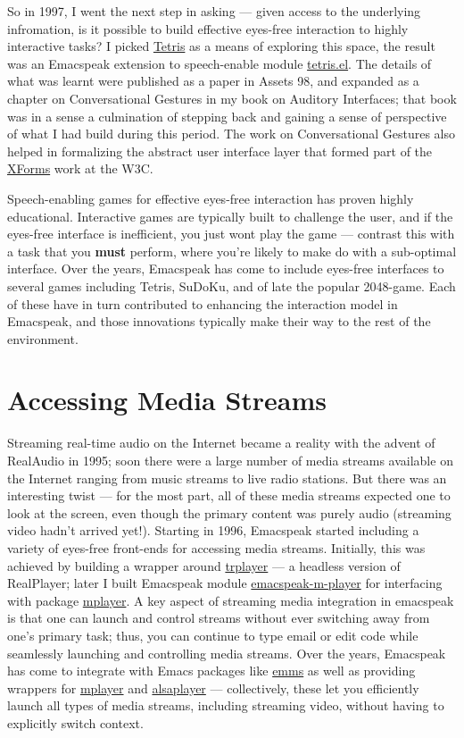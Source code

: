 \documentclass[11pt]{article}
\begin{document}
So in 1997, I went the
next step in asking  —   given access to the underlying
infromation, is it possible to build effective eyes-free
interaction to highly interactive tasks? I picked \uline{Tetris} as a
means of exploring this space, the result was an Emacspeak
extension to speech-enable module \uline{tetris.el}. The details of
what was learnt were published as a paper in Assets 98, and
expanded as a chapter on Conversational Gestures in my book on
Auditory Interfaces; that book was in a sense a culmination of
stepping back and gaining a sense of perspective of what I had
build during this period. The work on Conversational Gestures
also helped in formalizing the abstract user interface layer that
formed part of the \href{http://www.w3.org/MarkUp/Forms/}{XForms}  work at the W3C.

Speech-enabling games for effective eyes-free interaction  has
proven highly educational. Interactive games are typically built to challenge
the user,  and if the eyes-free interface is inefficient,  you
just wont play the game —
 contrast this with a task that you \textbf{must} perform, where you're
likely to make do with a sub-optimal interface.  Over the years,
Emacspeak has come to include eyes-free interfaces to several
games including Tetris, SuDoKu, and of late the popular
2048-game. Each of these have in turn contributed to  enhancing
the interaction model in Emacspeak, and those innovations
typically make their way to the rest of the environment. 


\section{Accessing Media Streams}
\label{sec-10}

Streaming real-time audio on the Internet became a reality with
the advent of RealAudio in 1995; soon there were a large number
of media streams available on the Internet ranging from music
streams to live radio stations. But there was an interesting
twist — for the most part, all of these media streams expected
one to look at the screen, even though the primary content was
purely audio (streaming video hadn't arrived yet!). Starting in
1996, Emacspeak started including a variety of eyes-free
front-ends for accessing media streams. Initially, this was
achieved by building a wrapper around \uline{trplayer} — a headless
version of RealPlayer; later I built Emacspeak module
\uline{emacspeak-m-player} for interfacing with package \uline{mplayer}. A
key aspect of streaming media integration in emacspeak is that
one can launch and control streams without ever switching away
from one's primary task; thus, you can continue to type email or
edit code while seamlessly launching and controlling media
streams. Over the years, Emacspeak has come to integrate with
Emacs packages like \uline{emms} as well as providing wrappers for
\uline{mplayer} and \uline{alsaplayer} — collectively, these let you
efficiently launch all types of media streams, including
streaming video, without having to explicitly switch context.
\end{document}
